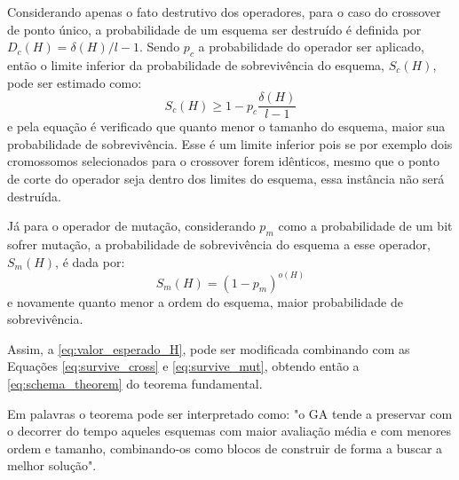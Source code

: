 Considerando apenas o fato destrutivo dos operadores, para o caso do crossover de ponto único, a probabilidade de um esquema ser destruído é definida por \(D_c(H) = {\delta(H)}/{l - 1}\). Sendo \(p_c\) a probabilidade do operador ser aplicado, então o limite inferior da probabilidade de sobrevivência do esquema, \(S_c(H)\), pode ser estimado como:
\begin{equation}
S_c(H) \ge 1 - p_c \frac{\delta(H)}{l - 1} %
\label{eq:survive_cross}
\end{equation}
e pela equação é verificado que quanto menor o tamanho do esquema, maior sua probabilidade de sobrevivência. Esse é um limite inferior pois se por exemplo dois cromossomos selecionados para o crossover forem idênticos, mesmo que o ponto de corte do operador seja dentro dos limites do esquema, essa instância não será destruída.

Já para o operador de mutação, considerando \(p_m\) como a probabilidade de um bit sofrer mutação, a probabilidade de sobrevivência do esquema a esse operador, \(S_m(H)\), é dada por:
\begin{equation}
S_m(H) = (1 - p_m)^{o(H)}
\label{eq:survive_mut}
\end{equation}
e novamente quanto menor a ordem do esquema, maior probabilidade de sobrevivência.

Assim, a \autoref{eq:valor_esperado_H}, pode ser modificada combinando com as Equações \ref{eq:survive_cross} e \ref{eq:survive_mut}, obtendo então a \autoref{eq:schema_theorem} do teorema fundamental.

Em palavras o teorema pode ser interpretado como: "o GA tende a preservar com o decorrer do tempo aqueles esquemas com maior avaliação média e com menores ordem e tamanho, combinando-os como blocos de construir de forma a buscar a melhor solução". \cite{Linden2008} 
 
